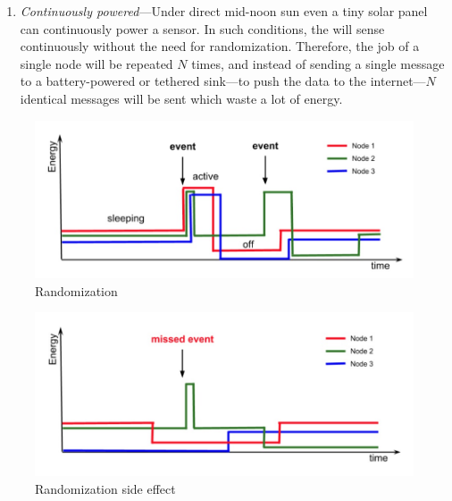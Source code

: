 \begin{enumerate}
		\item \label{it:continuous} \textit{Continuously powered}---Under direct mid-noon sun even a tiny solar panel can continuously power a sensor. In such conditions, the \sys will sense continuously without the need for randomization. Therefore, the job of a single node will be repeated $N$ times, and instead of sending a single message to a battery-powered or tethered sink---to push the data to the internet---$N$ identical messages will be sent which waste a lot of energy. 
				
\end{enumerate}
%
\begin{figure}
		\centering
		\includegraphics[width=\columnwidth]{figures/randomization}
		\caption{ Randomization}
		\label{fig:rand}
\end{figure} 
%
\begin{figure}
		\centering
		\includegraphics[width=\columnwidth]{figures/randomizationSideEffect}
		\caption{ Randomization side effect}
		\label{fig:randSideEffect}
\end{figure} 
%
